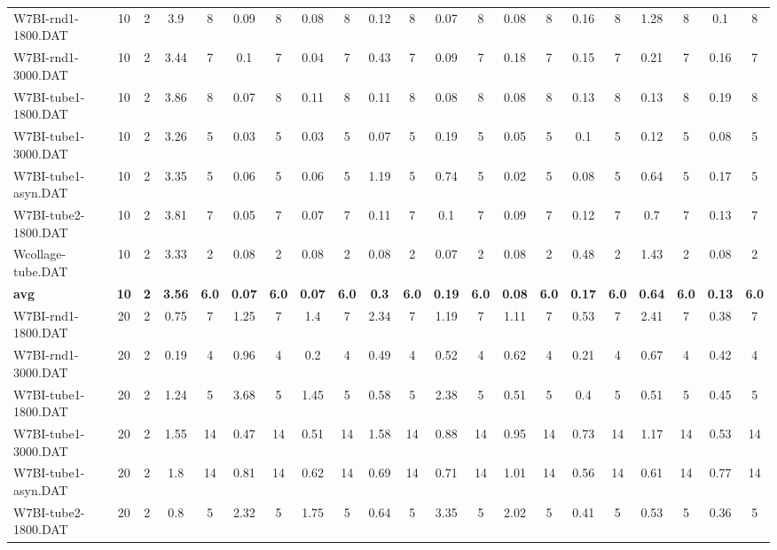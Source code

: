 \begin{sidewaystable}[!ht]
{\begin{tabular}{lcccccccccccccccccccc}
W7BI-rnd1-1800.DAT & 10 & 2 & 3.9 & 8 & 0.09 & 8 & 0.08 & 8 & 0.12 & 8 & 0.07 & 8 & 0.08 & 8 & 0.16 & 8 & 1.28 & 8 & 0.1 & 8 \\
W7BI-rnd1-3000.DAT & 10 & 2 & 3.44 & 7 & 0.1 & 7 & 0.04 & 7 & 0.43 & 7 & 0.09 & 7 & 0.18 & 7 & 0.15 & 7 & 0.21 & 7 & 0.16 & 7 \\
W7BI-tube1-1800.DAT & 10 & 2 & 3.86 & 8 & 0.07 & 8 & 0.11 & 8 & 0.11 & 8 & 0.08 & 8 & 0.08 & 8 & 0.13 & 8 & 0.13 & 8 & 0.19 & 8 \\
W7BI-tube1-3000.DAT & 10 & 2 & 3.26 & 5 & 0.03 & 5 & 0.03 & 5 & 0.07 & 5 & 0.19 & 5 & 0.05 & 5 & 0.1 & 5 & 0.12 & 5 & 0.08 & 5 \\
W7BI-tube1-asyn.DAT & 10 & 2 & 3.35 & 5 & 0.06 & 5 & 0.06 & 5 & 1.19 & 5 & 0.74 & 5 & 0.02 & 5 & 0.08 & 5 & 0.64 & 5 & 0.17 & 5 \\
W7BI-tube2-1800.DAT & 10 & 2 & 3.81 & 7 & 0.05 & 7 & 0.07 & 7 & 0.11 & 7 & 0.1 & 7 & 0.09 & 7 & 0.12 & 7 & 0.7 & 7 & 0.13 & 7 \\
Wcollage-tube.DAT & 10 & 2 & 3.33 & 2 & 0.08 & 2 & 0.08 & 2 & 0.08 & 2 & 0.07 & 2 & 0.08 & 2 & 0.48 & 2 & 1.43 & 2 & 0.08 & 2 \\
\cline{1-21} \textbf{avg} & \textbf{10} & \textbf{2} & \textbf{3.56} & \textbf{6.0} & \textbf{0.07} & \textbf{6.0} & \textbf{0.07} & \textbf{6.0} & \textbf{0.3} & \textbf{6.0} & \textbf{0.19} & \textbf{6.0} & \textbf{0.08} & \textbf{6.0} & \textbf{0.17} & \textbf{6.0} & \textbf{0.64} & \textbf{6.0} & \textbf{0.13} & \textbf{6.0} \\ \cline{1-21}
W7BI-rnd1-1800.DAT & 20 & 2 & 0.75 & 7 & 1.25 & 7 & 1.4 & 7 & 2.34 & 7 & 1.19 & 7 & 1.11 & 7 & 0.53 & 7 & 2.41 & 7 & 0.38 & 7 \\
W7BI-rnd1-3000.DAT & 20 & 2 & 0.19 & 4 & 0.96 & 4 & 0.2 & 4 & 0.49 & 4 & 0.52 & 4 & 0.62 & 4 & 0.21 & 4 & 0.67 & 4 & 0.42 & 4 \\
W7BI-tube1-1800.DAT & 20 & 2 & 1.24 & 5 & 3.68 & 5 & 1.45 & 5 & 0.58 & 5 & 2.38 & 5 & 0.51 & 5 & 0.4 & 5 & 0.51 & 5 & 0.45 & 5 \\
W7BI-tube1-3000.DAT & 20 & 2 & 1.55 & 14 & 0.47 & 14 & 0.51 & 14 & 1.58 & 14 & 0.88 & 14 & 0.95 & 14 & 0.73 & 14 & 1.17 & 14 & 0.53 & 14 \\
W7BI-tube1-asyn.DAT & 20 & 2 & 1.8 & 14 & 0.81 & 14 & 0.62 & 14 & 0.69 & 14 & 0.71 & 14 & 1.01 & 14 & 0.56 & 14 & 0.61 & 14 & 0.77 & 14 \\
W7BI-tube2-1800.DAT & 20 & 2 & 0.8 & 5 & 2.32 & 5 & 1.75 & 5 & 0.64 & 5 & 3.35 & 5 & 2.02 & 5 & 0.41 & 5 & 0.53 & 5 & 0.36 & 5 \\

\end{tabular}}
\end{sidewaystable}
